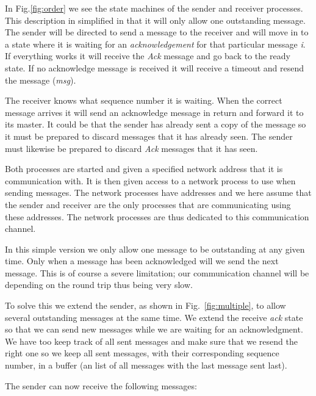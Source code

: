 \documentclass[a4paper,11pt]{article}
\begin{document}
In Fig.\ref{fig:order} we see the state machines of the sender and
receiver processes. This description in simplified in that it will
only allow one outstanding message. The sender will be directed to
send a message to the receiver and will move in to a state where it is
waiting for an {\em acknowledgement} for that particular message {\em
  i}. If everything works it will receive the {\em Ack} message and go
back to the ready state. If no acknowledge message is received it will
receive a timeout and resend the message ({\em msg}).

The receiver knows what sequence number it is waiting. When the
correct message arrives it will send an acknowledge message in return
and forward it to its master. It could be that the sender has already
sent a copy of the message so it must be prepared to discard messages
that it has already seen. The sender must likewise be prepared to
discard {\em Ack} messages that it has seen.

Both processes are started and given a specified network address that
it is communication with. It is then given access to a network process
to use when sending messages. The network processes have addresses and
we here assume that the sender and receiver are the only processes
that are communicating using these addresses. The network processes are
thus dedicated to this communication channel.

In this simple version we only allow one message to be outstanding at
any given time. Only when a message has been acknowledged will we send
the next message. This is of course a severe limitation; our
communication channel will be depending on the round trip thus being
very slow.

To solve this we extend the sender, as shown in
Fig.~\ref{fig:multiple}, to allow several outstanding messages at the
same time. We extend the receive {\em ack} state so that we
can send new messages while we are waiting for an acknowledgment. We
have too keep track of all sent messages and make sure that we resend
the right one so we keep all sent messages, with their corresponding
sequence number, in a buffer (an list of all messages with the last
message sent last).

The sender can now receive the following messages:
\end{document}
